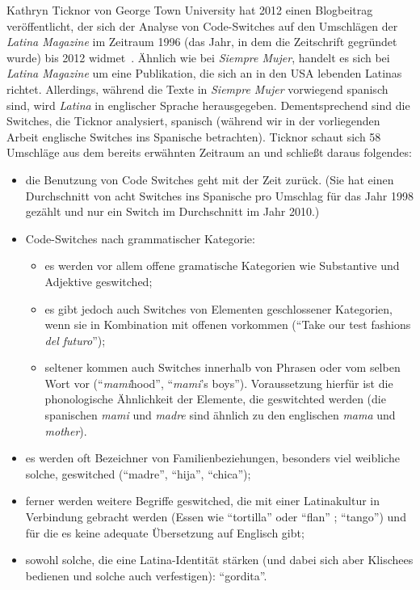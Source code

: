 Kathryn Ticknor von George Town University hat 2012 einen Blogbeitrag veröffentlicht, der sich der Analyse von Code-Switches auf den Umschlägen der \textit{Latina Magazine} im Zeitraum 1996 (das Jahr, in dem die Zeitschrift gegründet wurde) bis 2012 widmet~\cite[]{Ticknor12}.
Ähnlich wie bei \textit{Siempre Mujer}, handelt es sich bei \textit{Latina Magazine} um eine Publikation, die sich an in den USA lebenden Latinas richtet.
Allerdings, während die Texte in \textit{Siempre Mujer} vorwiegend spanisch sind, wird \textit{Latina} in englischer Sprache herausgegeben.
Dementsprechend sind die Switches, die Ticknor analysiert, spanisch (während wir in der vorliegenden Arbeit englische Switches ins Spanische betrachten).
Ticknor schaut sich 58 Umschläge aus dem bereits erwähnten Zeitraum an und schließt daraus folgendes:
\begin{itemize}
  \item die Benutzung von Code Switches geht mit der Zeit zurück. (Sie hat einen Durchschnitt von acht Switches ins Spanische pro Umschlag für das Jahr 1998 gezählt und nur ein Switch im Durchschnitt im Jahr 2010.)
  \item Code-Switches nach grammatischer Kategorie:
    \begin{itemize}
      \item es werden vor allem offene gramatische Kategorien wie Substantive und Adjektive geswitched;
      \item es gibt jedoch auch Switches von Elementen geschlossener Kategorien, wenn sie in Kombination mit offenen vorkommen (``Take our test fashions \textit{del futuro}'');
      \item seltener kommen auch Switches innerhalb von Phrasen oder vom selben Wort vor (``\textit{mami}hood'', ``\textit{mami}'s boys''). Voraussetzung hierfür ist die phonologische Ähnlichkeit der Elemente, die geswitchted werden (die spanischen \textit{mami} und \textit{madre} sind ähnlich zu den englischen \textit{mama} und \textit{mother}).
    \end{itemize}
  \item es werden oft Bezeichner von Familienbeziehungen, besonders viel weibliche solche, geswitched (``madre'', ``hija'', ``chica'');
  \item ferner werden weitere Begriffe geswitched, die mit einer Latinakultur in Verbindung gebracht werden (Essen wie ``tortilla'' oder ``flan'' ; ``tango'') und für die es keine adequate Übersetzung auf Englisch gibt;
  \item sowohl solche, die eine Latina-Identität stärken (und dabei sich aber Klischees bedienen und solche auch verfestigen): ``gordita''.
\end{itemize}

